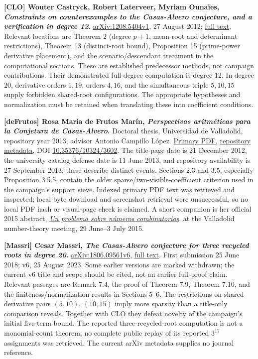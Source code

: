 \documentclass[
  british,
  10pt,
]{article}
\begin{document}
\textbf{{[}CLO{]} Wouter Castryck, Robert Laterveer, Myriam Ounaïes,
\emph{Constraints on counterexamples to the Casas-Alvero conjecture, and
a verification in degree 12}.}
\href{https://arxiv.org/abs/1208.5404v1}{arXiv:1208.5404v1}, 27 August
2012; \href{https://arxiv.org/html/1208.5404}{full text}. Relevant
locations are Theorem 2 (degree \(p+1\), mean-root and determinant
restrictions), Theorem 13 (distinct-root bound), Proposition 15
(prime-power derivative placement), and the scenario/descendant
treatment in the computational sections. These are established
predecessor methods, not campaign contributions. Their demonstrated
full-degree computation is degree 12. In degree 20, derivative orders
\(1,19\), orders \(4,16\), and the simultaneous triple \(5,10,15\)
supply forbidden shared-root configurations. The appropriate hypotheses
and normalization must be retained when translating these into
coefficient conditions.

\textbf{{[}deFrutos{]} Rosa María de Frutos Marín, \emph{Perspectivas
aritméticas para la Conjetura de Casas-Alvero}.} Doctoral thesis,
Universidad de Valladolid, repository year 2013; advisor Antonio
Campillo López.
\href{https://uvadoc.uva.es/bitstream/10324/3602/1/tesis367-130927.pdf}{Primary
PDF},
\href{https://uvadoc.uva.es/handle/10324/3602?show=full}{repository
metadata}, DOI
\href{https://doi.org/10.35376/10324/3602}{10.35376/10324/3602}. The
title-page date is 21 December 2012, the university catalog defense date
is 11 June 2013, and repository availability is 27 September 2013; these
describe distinct events. Sections 2.3 and 3.5, especially Proposition
3.5.5, contain the older sparse/two-visible-coefficient criterion used
in the campaign's support sieve. Indexed primary PDF text was retrieved
and inspected; local byte download and screenshot retrieval were
unsuccessful, so no local PDF hash or visual-page check is claimed. A
short companion is her official 2015 abstract,
\href{https://www.singacom.uva.es/JTN2015/contribuciones/ordinarias/frutos.pdf}{\emph{Un
problema sobre números combinatorios}}, at the Valladolid number-theory
meeting, 29 June--3 July 2015.

\textbf{{[}Massri{]} Cesar Massri, \emph{The Casas-Alvero conjecture for
three recycled roots in degree 20}.}
\href{https://arxiv.org/abs/1806.09561v6}{arXiv:1806.09561v6},
\href{https://arxiv.org/html/1806.09561v6}{full text}. First submission
25 June 2018; v6, 25 August 2023. Some earlier versions are marked
withdrawn; the current v6 title and scope should be cited, not an
earlier full-proof claim. Relevant passages are Remark 7.4, the proof of
Theorem 7.9, Theorem 7.10, and the finiteness/normalization results in
Sections 5--6. The restrictions on shared derivative pairs \((5,10)\),
\((10,15)\) imply more sparsity than a title-only comparison reveals.
Together with CLO they defeat novelty of the campaign's initial
five-term bound. The reported three-recycled-root computation is not a
monomial-count theorem; no complete public replay of its reported
\(3^{17}\) assignments was retrieved. The current arXiv metadata
supplies no journal reference.
\end{document}
